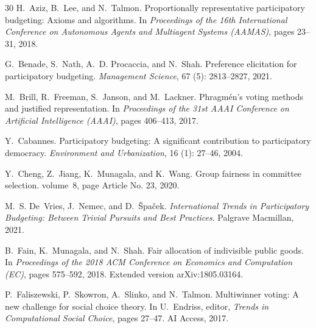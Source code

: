 \documentclass[10pt]{scrartcl}
\theoremstyle{definition}
\theoremstyle{plain}
\begin{document}
\begin{thebibliography}{30}
	H.~Aziz, B.~Lee, and N.~Talmon.
	\newblock Proportionally representative participatory budgeting: Axioms and
	algorithms.
	\newblock In \emph{Proceedings of the 16th International Conference on
		Autonomous Agents and Multiagent Systems (AAMAS)}, pages 23--31,
	2018{}.
	
	G.~Benade, S.~Nath, A.~D. Procaccia, and N.~Shah.
	\newblock Preference elicitation for participatory budgeting.
	\newblock \emph{Management Science}, 67 (5): 2813--2827,
	2021.
	
	M.~Brill, R.~Freeman, S.~Janson, and M.~Lackner.
	\newblock Phragm{\'e}n's voting methods and justified representation.
	\newblock In \emph{Proceedings of the 31st AAAI Conference on Artificial
		Intelligence (AAAI)}, pages 406--413, 2017.
	
	Y.~Cabannes.
	\newblock Participatory budgeting: A significant contribution to participatory
	democracy.
	\newblock \emph{Environment and Urbanization}, 16 (1):
	27--46, 2004.
	
	Y.~Cheng, Z.~Jiang, K.~Munagala, and K.~Wang.
	\newblock Group fairness in committee selection.
	\newblock volume~8, page Article No. 23, 2020.
	
	M.~S. De~Vries, J.~Nemec, and D.~{\v{S}}pa{\v{c}}ek.
	\newblock \emph{International Trends in Participatory Budgeting: Between
		Trivial Pursuits and Best Practices}.
	\newblock Palgrave Macmillan, 2021.
	
	B.~Fain, K.~Munagala, and N.~Shah.
	\newblock Fair allocation of indivisible public goods.
	\newblock In \emph{Proceedings of the 2018 ACM Conference on Economics and
		Computation (EC)}, pages 575--592, 2018.
	\newblock Extended version arXiv:1805.03164.
	
	P.~Faliszewski, P.~Skowron, A.~Slinko, and N.~Talmon.
	\newblock Multiwinner voting: A new challenge for social choice theory.
	\newblock In U.~Endriss, editor, \emph{Trends in Computational Social Choice},
	pages 27--47. AI Access, 2017.
	

\end{thebibliography}
\end{document}
